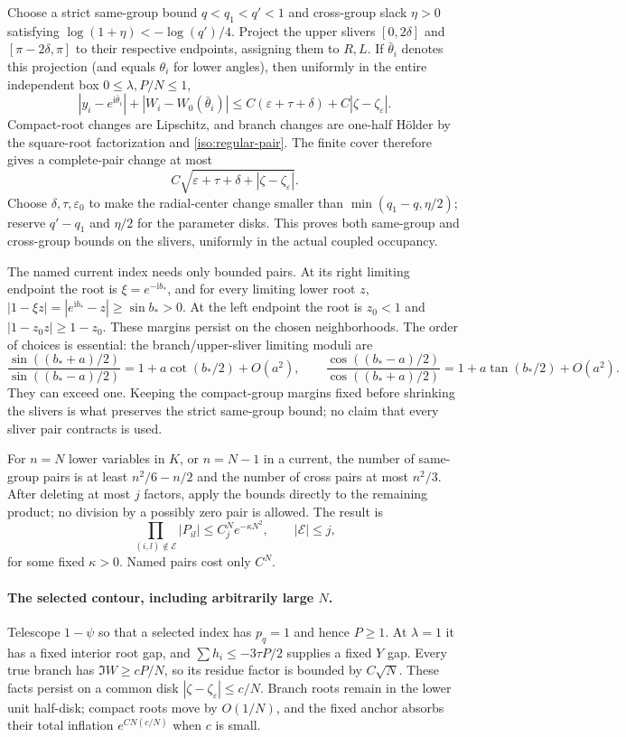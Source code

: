 \documentclass[11pt]{article}
\numberwithin{equation}{section}
\theoremstyle{definition}
\newcommand{\ii}{\mathrm i}
\newcommand{\eps}{\varepsilon}
\begin{document}
Choose a strict same-group bound $q<q_1<q'<1$ and cross-group slack
$\eta>0$ satisfying $\log(1+\eta)<-\log(q')/4$.
Project the upper slivers $[0,2\delta]$ and $[\pi-2\delta,\pi]$ to their
respective endpoints, assigning them to $R,L$. If $\bar\theta_i$ denotes
this projection (and equals $\theta_i$ for lower angles), then uniformly
in the entire independent box $0\le\lambda,P/N\le1$,
\[
 |y_i-e^{\ii\bar\theta_i}|+
 |W_i-W_0(\bar\theta_i)|
 \le C(\eps+\tau+\delta)+C|\zeta-\zeta_\eps|.
\]
Compact-root changes are Lipschitz, and branch changes are one-half
H\"older by the square-root factorization and
\eqref{iso:regular-pair}. The finite cover therefore gives a complete-pair
change at most
\[
 C\sqrt{\eps+\tau+\delta+|\zeta-\zeta_\eps|}.
\]
Choose $\delta,\tau,\eps_0$ to make the radial-center change smaller
than $\min(q_1-q,\eta/2)$; reserve $q'-q_1$ and $\eta/2$ for the
parameter disks. This proves both same-group and cross-group bounds
on the slivers, uniformly in the actual coupled occupancy.

The named current index needs only bounded pairs. At its right limiting
endpoint the root is $\xi=e^{-\ii b_*}$, and for every limiting lower root
$z$, $|1-\xi z|=|e^{\ii b_*}-z|\ge\sin b_*>0$.
At the left endpoint the root is $z_0<1$ and
$|1-z_0z|\ge1-z_0$. These margins persist on the chosen neighborhoods.
The order of choices is essential: the branch/upper-sliver limiting
moduli are
\[
 \frac{\sin((b_*+a)/2)}{\sin((b_*-a)/2)}
 =1+a\cot(b_*/2)+O(a^2),\qquad
 \frac{\cos((b_*-a)/2)}{\cos((b_*+a)/2)}
 =1+a\tan(b_*/2)+O(a^2).
\]
They can exceed one. Keeping the compact-group margins fixed before
shrinking the slivers is what preserves the strict same-group bound;
no claim that every sliver pair contracts is used.

For $n=N$ lower variables in $K$, or $n=N-1$ in a current, the number
of same-group pairs is at least $n^2/6-n/2$ and the number of cross pairs
at most $n^2/3$. After deleting at most $j$ factors, apply the bounds
directly to the remaining product; no division by a possibly zero pair
is allowed. The result is
\begin{equation}
 \prod_{(i,l)\notin\mathcal E}|P_{il}|
 \le C_j^N e^{-\kappa N^2},\qquad |\mathcal E|\le j,
 \label{iso:quadratic}
\end{equation}
for some fixed $\kappa>0$. Named pairs cost only $C^N$.

\paragraph{The selected contour, including arbitrarily large $N$.}
Telescope $1-\psi$ so that a selected index has $p_q=1$ and hence
$P\ge1$. At $\lambda=1$ it has a fixed interior root gap, and
$\sum h_i\le-3\tau P/2$ supplies a fixed $Y$ gap.
Every true branch has $\Im W\ge cP/N$, so its residue factor is
bounded by $C\sqrt N$. These facts persist on a common disk
$|\zeta-\zeta_\eps|\le c/N$. Branch roots remain in the lower unit
half-disk; compact roots move by $O(1/N)$, and the fixed anchor absorbs
their total inflation $e^{CN(c/N)}$ when $c$ is small.
\end{document}
